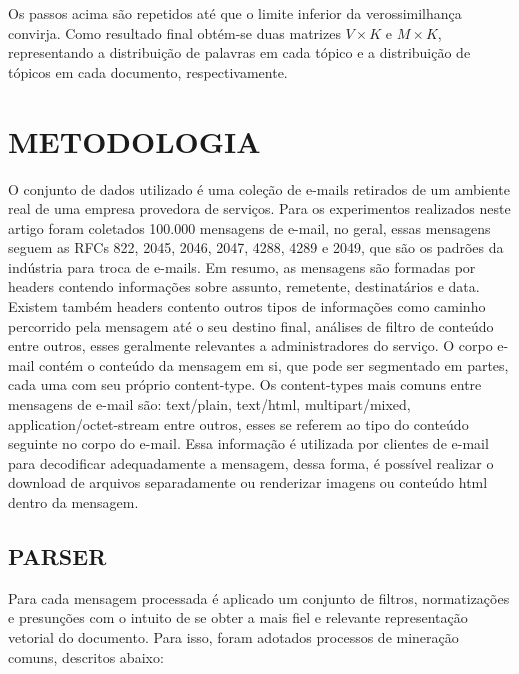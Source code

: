 \documentclass[12pt,a4paper]{article}
\begin{document}
Os passos acima são repetidos até que o limite inferior da verossimilhança convirja. Como resultado final obtém-se duas matrizes $V \times K$ e $M \times K$,
 representando  a distribuição de palavras em cada tópico e a distribuição de tópicos em cada documento, respectivamente.



\section{METODOLOGIA}
O conjunto de dados utilizado é uma coleção de e-mails retirados de um ambiente real de uma empresa provedora de serviços. 
 Para os experimentos realizados neste artigo foram coletados 100.000 mensagens de e-mail, no geral, essas mensagens seguem as RFCs 822, 2045, 2046, 2047, 4288, 4289 e 2049,
 que são os padrões da indústria para troca de e-mails.	Em resumo, as mensagens são formadas por headers contendo informações sobre assunto, remetente, destinatários e data.
 Existem também headers contento outros tipos de informações como caminho percorrido pela mensagem até o seu destino final, análises de filtro de conteúdo entre outros,
 esses geralmente relevantes a administradores do serviço. O corpo e-mail contém o conteúdo da mensagem em si, que pode ser segmentado em  partes, cada uma com seu próprio content-type. 
 Os content-types mais comuns entre mensagens de e-mail são: text/plain, text/html, multipart/mixed, application/octet-stream entre outros, esses se referem ao tipo do conteúdo seguinte no corpo do e-mail.
 Essa informação é utilizada por clientes de e-mail para decodificar adequadamente a mensagem,
 dessa forma, é possível realizar o download de arquivos separadamente ou renderizar imagens ou conteúdo html dentro da mensagem.


\subsection{PARSER}
Para cada mensagem processada é aplicado um conjunto de filtros, normatizações e presunções com o intuito de se obter a mais fiel e relevante representação vetorial do documento.
 Para isso, foram adotados processos de mineração comuns, descritos abaixo:
\end{document}
